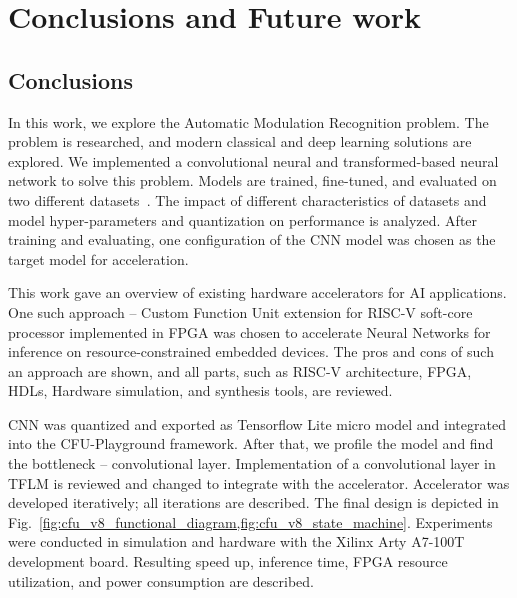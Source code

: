 
\chapter{Conclusions and Future work} \label{Chapter 6}

\section{Conclusions}
In this work, we explore the Automatic Modulation Recognition problem. The problem is researched, and modern classical and deep learning solutions are explored. We implemented a convolutional neural and transformed-based neural network to solve this problem. Models are trained, fine-tuned, and evaluated on two different datasets~\cite{cnn_dnn_simc,matlab_model}. The impact of different characteristics of datasets and model hyper-parameters and quantization on performance is analyzed. After training and evaluating, one configuration of the CNN model was chosen as the target model for acceleration. 

This work gave an overview of existing hardware accelerators for AI applications. One such approach -- Custom Function Unit extension for RISC-V soft-core processor implemented in FPGA was chosen to accelerate Neural Networks for inference on resource-constrained embedded devices. The pros and cons of such an approach are shown, and all parts, such as RISC-V architecture, FPGA, HDLs, Hardware simulation, and synthesis tools, are reviewed. 

CNN was quantized and exported as Tensorflow Lite micro model and integrated into the CFU-Playground framework. After that, we profile the model and find the bottleneck -- convolutional layer. Implementation of a convolutional layer in TFLM is reviewed and changed to integrate with the accelerator. Accelerator was developed iteratively; all iterations are described. The final design is depicted in Fig.~\cref{fig:cfu_v8_functional_diagram,fig:cfu_v8_state_machine}. Experiments were conducted in simulation and hardware with the Xilinx Arty A7-100T development board. Resulting speed up, inference time, FPGA resource utilization, and power consumption are described. 

